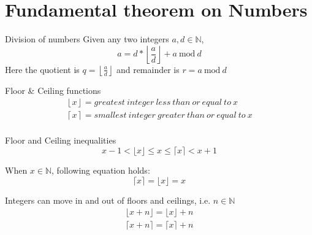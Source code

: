\chapter{Fundamental theorem on Numbers}
\newcommand{\Mod}[1]{\ \mathrm{mod}\ #1}

	\begin{section}{Division of numbers}
		Given any two integers $a, d \in \mathbb{N}$, 
		\begin{equation}
			a = d*\left\lfloor\frac{a}{d}\right\rfloor + a \Mod d
		\end{equation}
	Here the quotient is $q = \left\lfloor\frac{a}{d}\right\rfloor$ and remainder is $r = a \Mod d$
	\end{section}

	\begin{section}{Floor \& Ceiling functions}
		\begin{equation}
			\begin{aligned}
				\left\lfloor{x}\right\rfloor = greatest\: integer\: less\: than\: or\: equal\: to\: x \\
				\left\lceil{x}\right\rceil = smallest\: integer\: greater\: than\: or\: equal\: to\: x \\
			\end{aligned}
		\end{equation}
	\end{section}

	\begin{section}{Floor and Ceiling inequalities}
		\begin{equation}
			\boxed{ x-1 < \lfloor{x}\rfloor \leq x \leq \lceil{x}\rceil < x+1}
		\end{equation}

		When $x \in \mathbb{N}$,
		following equation holds:
		\begin{equation}
			\boxed{\lceil{x}\rceil = \lfloor{x}\rfloor = x}
		\end{equation}
	
		Integers can move in and out of floors and ceilings,
		i.e. $n \in \mathbb{N}$
		\begin{equation}
			\begin{aligned}
			\lfloor{x + n}\rfloor = \lfloor{x}\rfloor + n \\
			\lceil{x + n}\rceil = \lceil{x}\rceil + n
			\end{aligned}
		\end{equation}
	
	\end{section}
